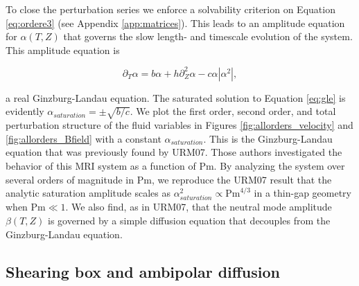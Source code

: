\documentclass{emulateapj}
\newcommand{\beq}{\begin{equation}}
\newcommand{\eeq}{\end{equation}}
\newcommand{\Pm}{\mathrm{Pm}}
\begin{document}
To close the perturbation series we enforce a solvability criterion on Equation \ref{eq:ordere3} (see Appendix \ref{app:matrices}). This leads to an amplitude equation for $\alpha(T, Z)$ that governs the slow length- and timescale evolution of the system. This amplitude equation is 

\beq
\label{eq:gle}
\partial_T \alpha = b \alpha + h \partial_Z^2 \alpha - c \alpha \left|\alpha^2\right|,
\eeq

a real Ginzburg-Landau equation. The saturated solution to Equation \ref{eq:gle} is evidently $\alpha_{saturation} = \pm \sqrt{b/c}$. We plot the first order, second order, and total perturbation structure of the fluid variables in Figures \ref{fig:allorders_velocity} and \ref{fig:allorders_Bfield} with a constant $\alpha_{saturation}$. This is the Ginzburg-Landau equation that was previously found by URM07. Those authors investigated the behavior of this MRI system as a function of $\Pm$. By analyzing the system over several orders of magnitude in $\Pm$, we reproduce the URM07 result that the analytic saturation amplitude scales as $\alpha_{saturation}^2 \propto \Pm^{4/3}$ in a thin-gap geometry when $\Pm \ll 1$. We also find, as in URM07, that the neutral mode amplitude $\beta(T, Z)$ is governed by a simple diffusion equation that decouples from the Ginzburg-Landau equation.

\subsection{\textbf{Shearing box and ambipolar diffusion}}
\end{document}
